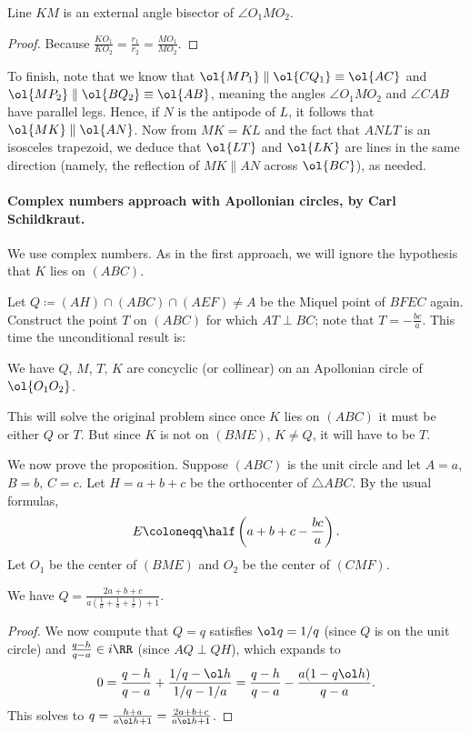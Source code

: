 \begin{claim*}
  Line $KM$ is an external angle bisector of $\angle O_1MO_2$.
\end{claim*}
\begin{proof}
  Because $\frac{KO_1}{KO_2} = \frac{r_1}{r_2} = \frac{MO_1}{MO_2}$.
\end{proof}

To finish, note that we know that
$\ol{MP_1} \parallel \ol{CQ_1} \equiv \ol{AC}$
and $\ol{MP_2} \parallel \ol{BQ_2} \equiv \ol{AB}$,
meaning the angles $\angle O_1 M O_2$ and $\angle CAB$ have parallel legs.
Hence, if $N$ is the antipode of $L$,
it follows that $\ol{MK} \parallel \ol{AN}$.
Now from $MK = KL$ and the fact that $ANLT$ is an isosceles trapezoid,
we deduce that $\ol{LT}$ and $\ol{LK}$ are lines in the same direction
(namely, the reflection of $MK \parallel AN$ across $\ol{BC}$), as needed.

\paragraph{Complex numbers approach with Apollonian circles, by Carl Schildkraut.}
We use complex numbers.
As in the first approach, we will ignore the hypothesis that $K$ lies on $(ABC)$.

Let $Q \coloneqq (AH) \cap (ABC) \cap (AEF) \neq A$
be the Miquel point of $BFEC$ again.
Construct the point $T$ on $(ABC)$ for which $AT\perp BC$;
note that $T=-\frac{bc}a$.
This time the unconditional result is:
\begin{proposition*}
  We have $Q$, $M$, $T$, $K$ are concyclic (or collinear)
  on an Apollonian circle of $\ol{O_1O_2}$.
\end{proposition*}
This will solve the original problem since once $K$ lies on $(ABC)$
it must be either $Q$ or $T$.
But since $K$ is not on $(BME)$, $K\neq Q$, it will have to be $T$.

We now prove the proposition.
Suppose $(ABC)$ is the unit circle and let $A=a$, $B=b$, $C=c$.
Let $H=a+b+c$ be the orthocenter of $\triangle ABC$.
By the usual formulas,
\[ E \coloneqq \half\left(a+b+c-\frac{bc}{a}\right). \]
Let $O_1$ be the center of $(BME)$ and $O_2$ be the center of $(CMF)$.

\begin{claim*}
  We have $Q = \frac{2a+b+c}{a\left( \frac 1a + \frac 1b + \frac 1c \right)+1}$.
\end{claim*}
\begin{proof}
  We now compute that $Q=q$ satisfies $\ol q=1/q$
  (since $Q$ is on the unit circle)
  and $\frac{q-h}{q-a}\in i\RR$ (since $AQ\perp QH$),
  which expands to
  \[0=\frac{q-h}{q-a}+\frac{1/q-\ol h}{1/q-1/a}
    =\frac{q-h}{q-a}-\frac{a(1-q\ol h)}{q-a}.\]
  This solves to $q=\frac{h+a}{a\ol h+1}=\frac{2a+b+c}{a\ol h+1}$.
\end{proof}

